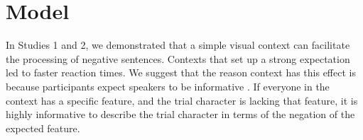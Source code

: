 \documentclass[10pt,letterpaper]{article}
\begin{document}



\section{Model}
In Studies 1 and 2, we demonstrated that a simple visual context can facilitate the processing of negative sentences.  Contexts that set up a strong expectation led to faster reaction times.  We suggest that the reason context has this effect is because participants expect speakers to be informative \cite{frank2012}.   If everyone in the context has a specific feature, and the trial character is lacking that feature, it is highly informative to describe the trial character in terms of the negation of the expected feature.  
\end{document}
